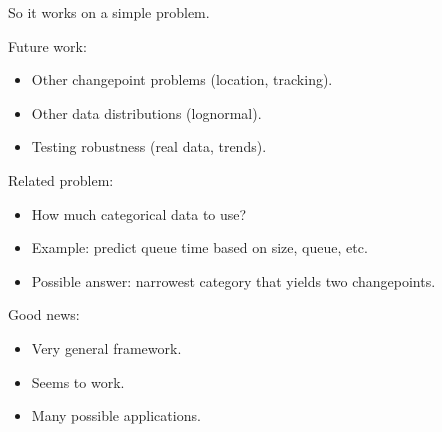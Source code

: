 \documentclass[pdf,letterpaper,allen]{prosper}
\begin{document}
\begin{slide}{}

So it works on a simple problem.

\vspace{0.1in}

Future work:

\begin{itemize}

\item Other changepoint problems (location, tracking).

\item Other data distributions (lognormal).

\item Testing robustness (real data, trends).

\end{itemize}

\end{slide}


\begin{slide}{}

Related problem:

\begin{itemize}

\item How much categorical data to use?

\item Example: predict queue time based on size, queue, etc.

\item Possible answer: narrowest category that
yields two changepoints.

\end{itemize}

\end{slide}


\begin{slide}{}

Good news:

\begin{itemize}

\item Very general framework.

\item Seems to work.

\item Many possible applications.

\end{itemize}

\end{slide}
\end{document}
